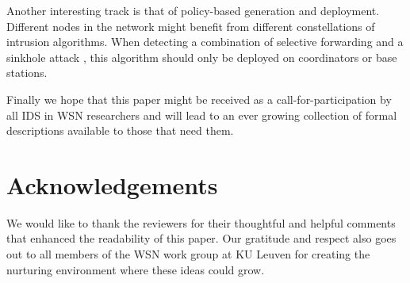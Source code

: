 \documentclass[conference]{IEEEtran}
\begin{document}
Another interesting track is that of policy-based generation and deployment.
Different nodes in the network might benefit from different constellations of
intrusion algorithms. When detecting a combination of selective forwarding and
a sinkhole attack \cite{ngai2006intruder}, this algorithm should only be
deployed on coordinators or base stations.

Finally we hope that this paper might be received as a call-for-participation
by all IDS in WSN researchers and will lead to an ever growing collection of
formal descriptions available to those that need them.

\section*{Acknowledgements}
\label{section:acknowledgements}

We would like to thank the reviewers for their thoughtful and helpful comments
that enhanced the readability of this paper. Our gratitude and respect also
goes out to all members of the WSN work group at KU Leuven for creating the
nurturing environment where these ideas could grow.



\end{document}
